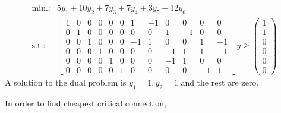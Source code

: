 \documentclass{article}
\begin{document}
\[
\begin{array}{cl}
\textrm{min.:} & 5y_1 + 10y_2 + 7y_3 + 7y_4 + 3y_5 + 12y_6\\
\textrm{s.t.:} &
 \begin{bmatrix}%
 1 & 0 & 0 & 0 & 0 & 0 & 1 & -1 & 0 & 0 & 0 & 0\\
 0 & 1 & 0 & 0 & 0 & 0 & 0 & 0 & 1 & -1 & 0 & 0\\
 0 & 0 & 1 & 0 & 0 & 0 & -1 & 1 & 0 & 0 & 1 & -1\\
 0 & 0 & 0 & 1 & 0 & 0 & 0 & 0 & -1 & 1 & 1 & -1\\
 0 & 0 & 0 & 0 & 1 & 0 & 0 & 0 & -1 & 1 & 0 & 0\\
 0 & 0 & 0 & 0 & 0 & 1 & 0 & 0 & 0 & 0 & -1 & 1
\end{bmatrix}y
\geq
\begin{pmatrix}
  1\\ 1\\ 0\\ 0\\ 0\\ 0
\end{pmatrix}
\end{array}
\]
A solution to the dual problem is $y_1 = 1, y_2 = 1$ and the rest are
zero.

In order to find cheapest critical connection, 


\vfill
 
\end{document}

